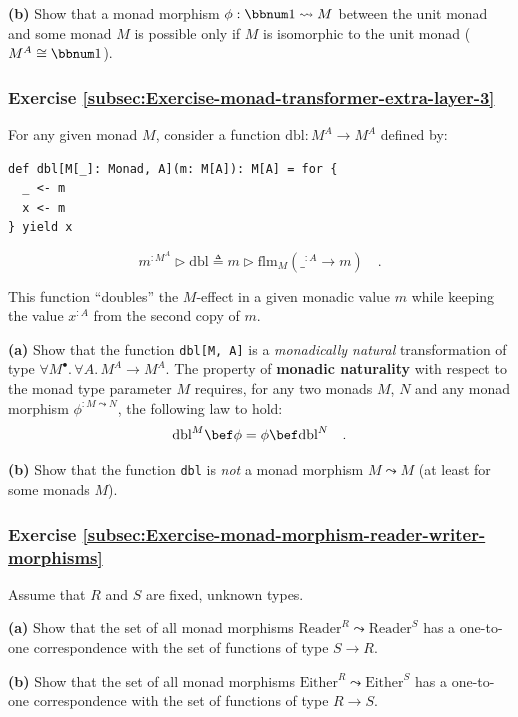 \textbf{(b)} Show that a monad morphism $\phi:\bbnum 1\leadsto M$
between the unit monad and some monad $M$ is possible only if $M$
is isomorphic to the unit monad ($M^{A}\cong\bbnum 1$).

\subsubsection{Exercise \label{subsec:Exercise-monad-transformer-extra-layer-3}\ref{subsec:Exercise-monad-transformer-extra-layer-3}}

For any given monad $M$, consider a function $\text{dbl}:M^{A}\rightarrow M^{A}$
defined by:
\begin{lstlisting}
def dbl[M[_]: Monad, A](m: M[A]): M[A] = for {
  _ <- m
  x <- m
} yield x
\end{lstlisting}
\[
m^{:M^{A}}\triangleright\text{dbl}\triangleq m\triangleright\text{flm}_{M}(\_^{:A}\rightarrow m)\quad.
\]

This function \textsf{``}doubles\textsf{''} the $M$-effect in a given monadic value
$m$ while keeping the value $x^{:A}$ from the second copy of $m$.

\textbf{(a)} Show that the function \lstinline!dbl[M, A]! is a \emph{monadically
natural} transformation of type $\forall M^{\bullet}.\,\forall A.\,M^{A}\rightarrow M^{A}$.
The property of \textbf{monadic naturality}
with respect to the monad type parameter $M$ requires, for any two
monads $M$, $N$ and any monad morphism $\phi^{:M\leadsto N}$, the
following law to hold:
\[
\text{dbl}^{M}\bef\phi=\phi\bef\text{dbl}^{N}\quad.
\]

\textbf{(b)} Show that the function \lstinline!dbl! is \emph{not}
a monad morphism $M\leadsto M$ (at least for some monads $M$).

\subsubsection{Exercise \label{subsec:Exercise-monad-morphism-reader-writer-morphisms}\ref{subsec:Exercise-monad-morphism-reader-writer-morphisms}}

Assume that $R$ and $S$ are fixed, unknown types.

\textbf{(a)} Show that the set of all monad morphisms $\text{Reader}^{R}\leadsto\text{Reader}^{S}$
has a one-to-one correspondence with the set of functions of type
$S\rightarrow R$. 

\textbf{(b)} Show that the set of all monad morphisms $\text{Either}^{R}\leadsto\text{Either}^{S}$
has a one-to-one correspondence with the set of functions of type
$R\rightarrow S$. 

